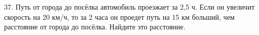 37. Путь от города до посёлка автомобиль проезжает за 2,5 ч. Если он увеличит скорость на 20 км/ч, то за 2 часа он проедет путь на 15 км больший, чем расстояние от города до посёлка. Найдите это расстояние.\\
